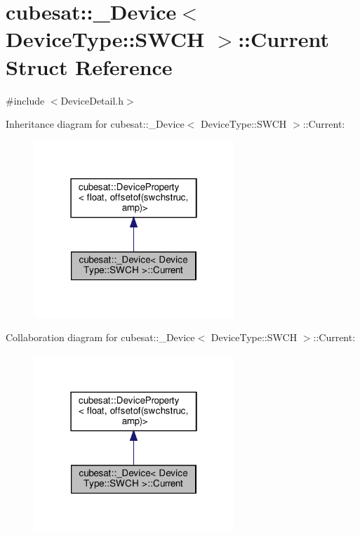 \hypertarget{structcubesat_1_1__Device_3_01DeviceType_1_1SWCH_01_4_1_1Current}{}\section{cubesat\+:\+:\+\_\+\+Device$<$ Device\+Type\+:\+:S\+W\+CH $>$\+:\+:Current Struct Reference}
\label{structcubesat_1_1__Device_3_01DeviceType_1_1SWCH_01_4_1_1Current}


{\ttfamily \#include $<$Device\+Detail.\+h$>$}



Inheritance diagram for cubesat\+:\+:\+\_\+\+Device$<$ Device\+Type\+:\+:S\+W\+CH $>$\+:\+:Current\+:\nopagebreak
\begin{figure}[H]
\begin{center}
\leavevmode
\includegraphics[width=214pt]{structcubesat_1_1__Device_3_01DeviceType_1_1SWCH_01_4_1_1Current__inherit__graph}
\end{center}
\end{figure}


Collaboration diagram for cubesat\+:\+:\+\_\+\+Device$<$ Device\+Type\+:\+:S\+W\+CH $>$\+:\+:Current\+:\nopagebreak
\begin{figure}[H]
\begin{center}
\leavevmode
\includegraphics[width=214pt]{structcubesat_1_1__Device_3_01DeviceType_1_1SWCH_01_4_1_1Current__coll__graph}
\end{center}
\end{figure}
